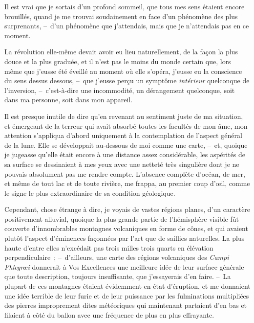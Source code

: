 \documentclass[french,twoside]{book} %
\begin{document}
Il est vrai que je sortais d’un profond sommeil, que tous mes sens étaient encore brouillés, quand je me trouvai soudainement en face d’un phénomène des plus surprenants, – d’un phénomène que j’attendais, mais que je n’attendais pas en ce moment.\par
La révolution elle-même devait avoir eu lieu naturellement, de la façon la plus douce et la plus graduée, et il n’est pas le moins du monde certain que, lors même que j’eusse été éveillé au moment où elle s’opéra, j’eusse eu la conscience du sens dessus dessous, – que j’eusse perçu un symptôme \emph{intérieur} quelconque de l’inversion, – c’est-à-dire une incommodité, un dérangement quelconque, soit dans ma personne, soit dans mon appareil.\par
Il est presque inutile de dire qu’en revenant au sentiment juste de ma situation, et émergeant de la terreur qui avait absorbé toutes les facultés de mon âme, mon attention s’appliqua d’abord uniquement à la contemplation de l’aspect général de la lune. Elle se développait au-dessous de moi comme une carte, – et, quoique je jugeasse qu’elle était encore à une distance assez considérable, les aspérités de sa surface se dessinaient à mes yeux avec une netteté très singulière dont je ne pouvais absolument pas me rendre compte. L’absence complète d’océan, de mer, et même de tout lac et de toute rivière, me frappa, au premier coup d’œil, comme le signe le plus extraordinaire de sa condition géologique.\par
Cependant, chose étrange à dire, je voyais de vastes régions planes, d’un caractère positivement alluvial, quoique la plus grande partie de l’hémisphère visible fût couverte d’innombrables montagnes volcaniques en forme de cônes, et qui avaient plutôt l’aspect d’éminences façonnées par l’art que de saillies naturelles. La plus haute d’entre elles n’excédait pas trois milles trois quarts en élévation perpendiculaire ; – d’ailleurs, une carte des régions volcaniques des \emph{Campi Phlegrœi} donnerait à Vos Excellences une meilleure idée de leur surface générale que toute description, toujours insuffisante, que j’essayerais d’en faire. – La plupart de ces montagnes étaient évidemment en état d’éruption, et me donnaient une idée terrible de leur furie et de leur puissance par les fulminations multipliées des pierres improprement dites météoriques qui maintenant partaient d’en bas et filaient à côté du ballon avec une fréquence de plus en plus effrayante.\par
\end{document}
